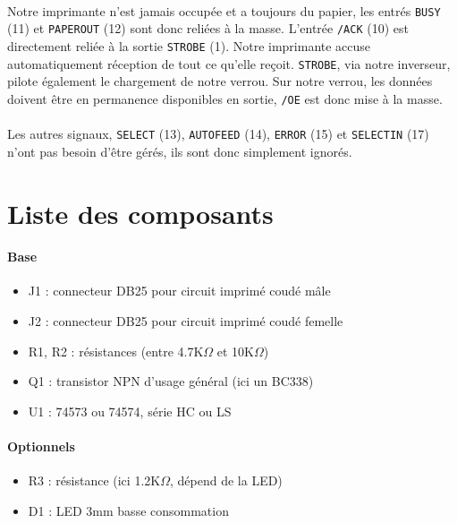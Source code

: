 \documentclass[11pt,a4paper]{book}
\begin{document}
\paragraph*{}
 Notre imprimante n'est jamais occup\'ee et a toujours du papier, les entr\'es {\tt BUSY} (11) et
 {\tt PAPEROUT} (12) sont donc reli\'ees \`a la masse. L'entr\'ee {\tt /ACK} (10) est directement reli\'ee
 \`a la sortie {\tt STROBE} (1). Notre imprimante accuse automatiquement r\'eception de tout ce
 qu'elle re\c{c}oit. {\tt STROBE}, via notre inverseur, pilote \'egalement le chargement de notre
 verrou. Sur notre verrou, les donn\'ees doivent \^etre en permanence disponibles en sortie,
 {\tt /OE} est donc mise \`a la masse.
 
 \paragraph*{}
 Les autres signaux, {\tt SELECT} (13), {\tt AUTOFEED} (14), {\tt ERROR} (15) et 
 {\tt SELECTIN} (17) n'ont pas besoin d'\^etre g\'er\'es, ils sont donc simplement ignor\'es. 
 
\section{Liste des composants}

\paragraph*{Base}
\begin{itemize}
\item J1 : connecteur DB25 pour circuit imprim\'e coud\'e m\^ale
\item J2 : connecteur DB25 pour circuit imprim\'e coud\'e femelle
\item R1, R2 : r\'esistances (entre 4.7K$\Omega$ et 10K$\Omega$)
\item Q1 : transistor NPN d'usage g\'en\'eral (ici un BC338)
\item U1 : 74573 ou 74574, s\'erie HC ou LS
\end{itemize} 

\paragraph*{Optionnels}
\begin{itemize}
\item R3 : r\'esistance (ici 1.2K$\Omega$, d\'epend de la LED)
\item D1 : LED 3mm basse consommation
\end{itemize}
 
\end{document}
